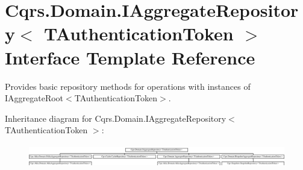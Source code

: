 \hypertarget{interfaceCqrs_1_1Domain_1_1IAggregateRepository}{}\section{Cqrs.\+Domain.\+I\+Aggregate\+Repository$<$ T\+Authentication\+Token $>$ Interface Template Reference}
\label{interfaceCqrs_1_1Domain_1_1IAggregateRepository}


Provides basic repository methods for operations with instances of I\+Aggregate\+Root$<$\+T\+Authentication\+Token$>$.  


Inheritance diagram for Cqrs.\+Domain.\+I\+Aggregate\+Repository$<$ T\+Authentication\+Token $>$\+:\begin{figure}[H]
\begin{center}
\leavevmode
\includegraphics[height=0.992908cm]{interfaceCqrs_1_1Domain_1_1IAggregateRepository}
\end{center}
\end{figure}
